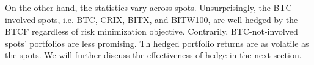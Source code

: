
On the other hand, the statistics vary across spots.
Unsurprisingly, the BTC-involved spots, i.e. BTC, CRIX, BITX, and BITW100, are well hedged by the BTCF regardless of risk minimization objective.
Contrarily, BTC-not-involved spots' portfolios are less promising.
Th hedged portfolio returns are as volatile as the spots. 
We will further discuss the effectiveness of hedge in the next section. %

